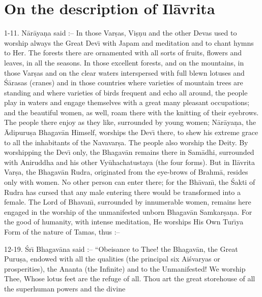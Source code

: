 \chapter{On the description of Il\=avrita}

1-11. N\=ar\=aya\d{n}a said :-- In those Var\d{s}as, Vi\d{s}\d{n}u and the other Devas used to worship always the Great Dev\={\i} with Japam and meditation and to chant hymns to Her. The forests there are ornamented with all sorts of fruits, flowers and leaves, in all the seasons. In those excellent forests, and on the mountains, in those Var\d{s}as and on the clear waters interspersed with full blewn lotuses and \'S\=arasas (cranes) and in those countries where varieties of mountain trees are standing and where varieties of birds frequent and echo all around, the people play in waters and engage themselves with a great many pleasant occupations; and the beautiful women, as well, roam there with the knitting of their eyebrows. The people there enjoy as they like, surrounded by young women; N\=ar\=aya\d{n}a, the \=Adipuru\d{s}a Bhagav\=an Himself, worships the Dev\={\i} there, to shew his extreme grace to all the inhabitants of the Navavar\d{s}a. The people also worship the Deity. By worshipping the Dev\={\i} only, the Bhagav\=an remains there in Sam\=adhi, surrounded with Aniruddha and his other Vy\=uhachatustaya (the four forms). But in Il\=avrita Var\d{s}a, the Bhagav\=an Rudra, originated from the eye-brows of Brahm\=a, resides only with women. No other person can enter there; for the Bh\=avan\={\i}, the \'Sakti of Rudra has cursed that any male entering there would be transformed into a female. The Lord of Bhavan\={\i}, surrounded by innumerable women, remains here engaged in the worship of the unmanifested unborn Bhagav\=an Samkar\d{s}a\d{n}a. For the good of humanity, with intense meditation, He worships His Own Tur\={\i}ya Form of the nature of Tamas, thus :--

12-19. \'Sr\={\i} Bhagav\=ana said :-- ``Obeisance to Thee! the Bhagav\=an, the Great Puru\d{s}a, endowed with all the qualities (the principal six Ai\'svaryas or prosperities), the Ananta (the Infinite) and to the Unmanifested! We worship Thee, Whose lotus feet are the refuge of all. Thou art the great storehouse of all the superhuman powers and the divine

